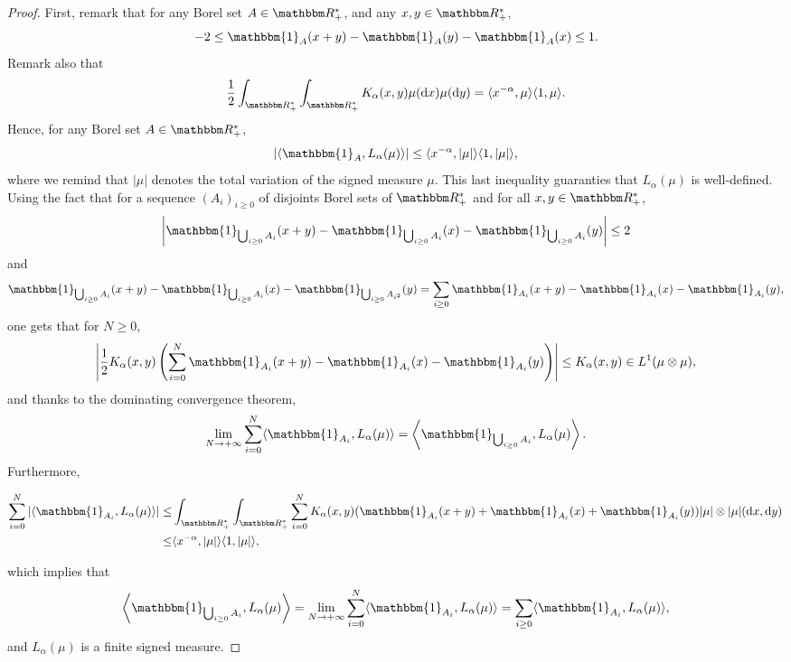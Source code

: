 \documentclass[a4paper,11pt, reqno]{amsart}
\newcommand{\dd}{\mathop{}\!\mathrm{d}}
\newcommand{\1}{\mathbbm{1}}
\theoremstyle{plain}
\theoremstyle{definition}
\begin{document}
\begin{proof}
  First, remark that for any Borel set $A \in \RR_+^{\ast}$, and any
  $x, y \in \RR_+^{\ast}$,
  \[ - 2 \le \mathbbm{1}_A (x + y) - \mathbbm{1}_A (y) - \mathbbm{1}_A
     (x) \le 1. \]
  Remark also that
  \[ \frac{1}{2} \int_{\RR_+^{\ast}} \int_{\RR_+^{\ast}}
     K_{\alpha} (x, y) \mu (\dd x) \mu (\dd y) = \langle x^{- \alpha},
     \mu \rangle \langle 1, \mu \rangle . \]
  Hence, for any Borel set $A \in \RR_+^{\ast}$,
  \[ | \langle \mathbbm{1}_A, L_{\alpha} (\mu) \rangle | \le \langle
     x^{- \alpha}, | \mu | \rangle \langle 1, | \mu | \rangle, \]
  where we remind that $| \mu |$ denotes the total variation of the signed
  measure $\mu$. This last inequality guaranties that $L_{\alpha} (\mu)$ is
  well-defined. Using the fact that for a sequence $(A_i)_{i \ge 0}$ of
  disjoints Borel sets of $\RR_+^{\ast}$ and for all $x, y \in
  \RR_+^{\ast}$,
  \[ \left| \mathbbm{1}_{\bigcup_{i \ge 0} A_i} (x + y) -
     \mathbbm{1}_{\bigcup_{i \ge 0} A_i} (x) - \mathbbm{1}_{\bigcup_{i
     \ge 0} A_i} (y) \right| \le 2 \]
  and
  \[ \mathbbm{1}_{\bigcup_{i \ge 0} A_i} (x + y) -
     \mathbbm{1}_{\bigcup_{i \ge 0} A_i} (x) - \mathbbm{1}_{\bigcup_{i
     \ge 0} A_{i^2}} (y) = \sum_{i \ge 0} \mathbbm{1}_{A_i} (x +
     y) - \mathbbm{1}_{A_i} (x) - \mathbbm{1}_{A_i} (y), \]
  one gets that for $N \ge 0$,
  \[ \left| \frac{1}{2} K_{\alpha} (x, y) \left( \sum_{i = 0}^N
     \mathbbm{1}_{A_i} (x + y) - \mathbbm{1}_{A_i} (x) - \mathbbm{1}_{A_i} (y)
     \right) \right| \le K_{\alpha} (x, y) \in L^1 (\mu \otimes \mu), \]
  and thanks to the dominating convergence theorem,
  \[ \underset{N \rightarrow + \infty}{\lim} \sum_{i = 0}^N \langle
     \mathbbm{1}_{A_i}, L_{\alpha} (\mu) \rangle = \left\langle
     \mathbbm{1}_{\bigcup_{i \ge 0} A_i}, L_{\alpha} (\mu) \right\rangle
     . \]
  Furthermore,
  
  \begin{align*}
    \sum_{i = 0}^N | \langle \mathbbm{1}_{A_i}, L_{\alpha} (\mu) \rangle |
    \le & \int_{\RR^{\ast}_+} \int_{\RR^{\ast}_+} \sum_{i
    = 0}^N K_{\alpha} (x, y) (\mathbbm{1}_{A_i} (x + y) + \mathbbm{1}_{A_i}
    (x) + \mathbbm{1}_{A_i} (y)) | \mu | \otimes | \mu | (\dd x, \dd
    y)\\
    \le & \langle x^{- \alpha}, | \mu | \rangle \langle 1, | \mu |
    \rangle,
  \end{align*}
  
  which implies that
  \[ \left\langle \mathbbm{1}_{\bigcup_{i \ge 0} A_i}, L_{\alpha} (\mu)
     \right\rangle = \underset{N \rightarrow + \infty}{\lim} \sum_{i = 0}^N
     \langle \mathbbm{1}_{A_i}, L_{\alpha} (\mu) \rangle = \sum_{i \ge
     0} \langle \mathbbm{1}_{A_i}, L_{\alpha} (\mu) \rangle, \]
  and $L_{\alpha} (\mu)$ is a finite signed measure.
  

\end{proof}
\end{document}
